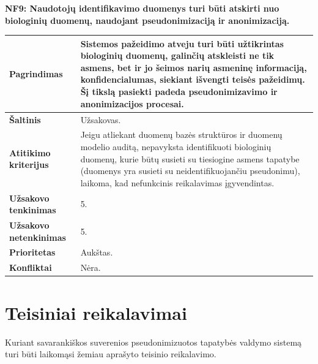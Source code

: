 \documentclass[12pt]{article}
\begin{document}
\noindent \textbf{NF9: Naudotojų identifikavimo duomenys turi būti atskirti nuo
biologinių duomenų, naudojant pseudonimizaciją ir anonimizaciją.}
\label{sec:NF9}
\begin{table}[htb!]
    \captionsetup{justification=centering}
    \vskip -10pt
    \begin{tabular}{|m{4.9cm}|m{11cm}|}
        \hline
        \raggedleft \textbf{\cellcolor{deepchampagne}Pagrindimas} &
        Sistemos pažeidimo atveju turi būti užtikrintas biologinių duomenų,
        galinčių atskleisti ne tik asmens, bet ir jo šeimos narių asmeninę
        informaciją, konfidencialumas, siekiant išvengti teisės pažeidimų. Šį
        tikslą pasiekti padeda pseudonimizavimo ir anonimizacijos procesai. \\
        \hline
        \raggedleft \textbf{\cellcolor{deepchampagne}Šaltinis} & Užsakovas. \\
        \hline
        \raggedleft \textbf{\cellcolor{deepchampagne}Atitikimo kriterijus} & 
        Jeigu atliekant duomenų bazės struktūros ir duomenų modelio auditą,
        nepavyksta identifikuoti biologinių duomenų, kurie būtų susieti su
        tiesiogine asmens tapatybe (duomenys yra susieti su neidentifikuojančiu
        pseudonimu), laikoma, kad nefunkcinis reikalavimas įgyvendintas. \\
        \hline
        \raggedleft \textbf{\cellcolor{deepchampagne}Užsakovo tenkinimas} & 5. \\
        \hline
        \raggedleft \textbf{\cellcolor{deepchampagne}Užsakovo netenkinimas} & 5. \\
        \hline
        \raggedleft \textbf{\cellcolor{deepchampagne}Prioritetas} & Aukštas. \\
        \hline
        \raggedleft \textbf{\cellcolor{deepchampagne}Konfliktai} & Nėra. \\
        \hline
    \end{tabular}
\end{table}

\newpage

\section{Teisiniai reikalavimai}
Kuriant savarankiškos suverenios pseudonimizuotos tapatybės valdymo sistemą
turi būti laikomąsi žemiau aprašyto teisinio reikalavimo.
\vskip 10pt
\end{document}

